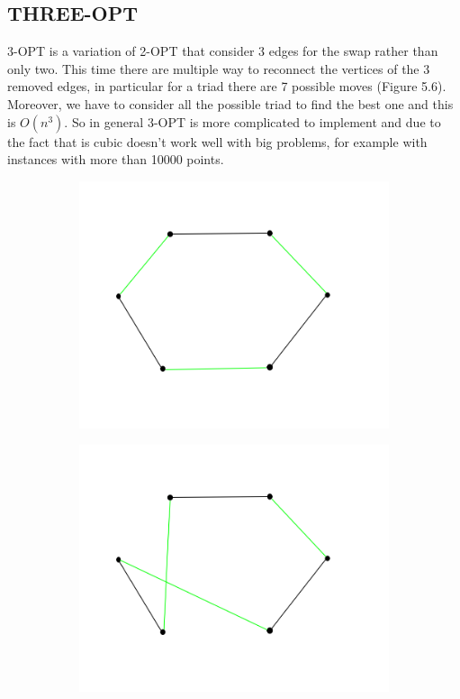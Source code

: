 \subsection{THREE-OPT}
3-OPT is a variation of 2-OPT that consider 3 edges for the swap rather than only two. This time there are multiple way to reconnect the vertices of the 3 removed edges, in particular for a triad there are 7 possible moves (Figure 5.6). Moreover, we have to consider all the possible triad to find the best one and this is $O(n^3)$. So in general 3-OPT is more complicated to implement and due to the fact that is cubic doesn't work well with big problems, for example with instances with more than 10000 points.

\begin{figure}[h!]
  \centering
  \begin{subfigure}[b]{0.24\linewidth}
    \includegraphics[width=\linewidth]{media/3opt1.png}
     \caption{}
  \end{subfigure}
  \begin{subfigure}[b]{0.24\linewidth}
    \includegraphics[width=\linewidth]{media/3opt2.png}

\end{subfigure}
\end{figure}
